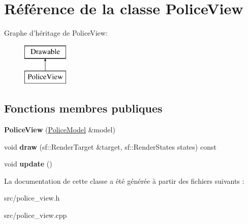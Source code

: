 \hypertarget{class_police_view}{\section{Référence de la classe Police\+View}
\label{class_police_view}
}
Graphe d'héritage de Police\+View\+:\begin{figure}[H]
\begin{center}
\leavevmode
\includegraphics[height=2.000000cm]{class_police_view}
\end{center}
\end{figure}
\subsection*{Fonctions membres publiques}
\begin{DoxyCompactItemize}
\item 
\hypertarget{class_police_view_a85e6ebced5901c559ade16ed25c11d8a}{{\bfseries Police\+View} (\hyperlink{class_police_model}{Police\+Model} \&model)}\label{class_police_view_a85e6ebced5901c559ade16ed25c11d8a}

\item 
\hypertarget{class_police_view_af391700d07743fbc08581c03ebc43218}{void {\bfseries draw} (sf\+::\+Render\+Target \&target, sf\+::\+Render\+States states) const }\label{class_police_view_af391700d07743fbc08581c03ebc43218}

\item 
\hypertarget{class_police_view_adda8d452b7cefad26a840939ce2ad48a}{void {\bfseries update} ()}\label{class_police_view_adda8d452b7cefad26a840939ce2ad48a}

\end{DoxyCompactItemize}


La documentation de cette classe a été générée à partir des fichiers suivants \+:\begin{DoxyCompactItemize}
\item 
src/police\+\_\+view.\+h\item 
src/police\+\_\+view.\+cpp\end{DoxyCompactItemize}
